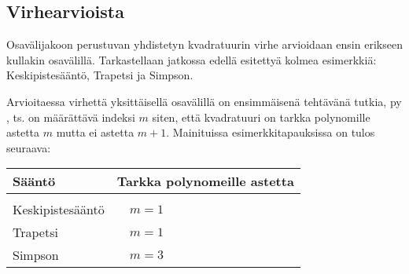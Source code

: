 \subsection*{Virhearvioista}

Osavälijakoon perustuvan yhdistetyn kvadratuurin virhe arvioidaan ensin erikseen kullakin
osavälillä. Tarkastellaan jatkossa edellä esitettyä kolmea esimerkkiä: Keskipistesääntö, 
Trapetsi ja Simpson.

Arvioitaessa virhettä yksittäisellä osavälillä on ensimmäisenä tehtävänä tutkia,  
 py   
, ts. on määrättävä indeksi $m$ siten, että kvadratuuri on tarkka polynomille
astetta $m$ mutta ei astetta $m+1$. Mainituissa esimerkkitapauksissa on tulos seuraava:
\begin{center}
\begin{tabular}{ll}
Sääntö & \hspace{2mm} Tarkka polynomeille astetta \\ \hline \\
Keskipistesääntö & $\quad m=1$ \\ Trapetsi & $\quad m=1$ \\ Simpson & $\quad m=3$
\end{tabular}
\end{center}

